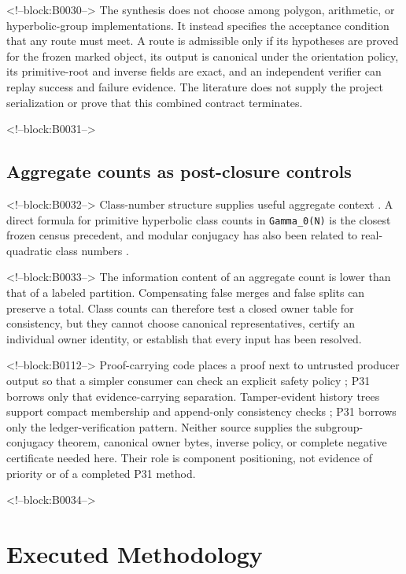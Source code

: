 \documentclass[11pt]{article}
\begin{document}
<!--block:B0030-->
The synthesis does not choose among polygon, arithmetic, or
hyperbolic-group implementations. It instead specifies the acceptance
condition that any route must meet. A route is admissible only if its
hypotheses are proved for the frozen marked object, its output is
canonical under the orientation policy, its primitive-root and inverse
fields are exact, and an independent verifier can replay success and
failure evidence. The literature does not supply the project
serialization or prove that this combined contract terminates.

<!--block:B0031-->
\hypertarget{24-aggregate-counts-as-post-closure-controls}{%
\subsection{Aggregate counts as post-closure
controls}\label{24-aggregate-counts-as-post-closure-controls}}

<!--block:B0032-->
Class-number structure supplies useful aggregate context
\citep{P31-S14}.
A direct formula for primitive hyperbolic class counts in
\texttt{Gamma\_0(N)} is the closest frozen census precedent, and modular
conjugacy has also been related to real-quadratic class numbers
\citep{P31-S21,P31-S22}.

<!--block:B0033-->
The information content of an aggregate count is lower than that of a
labeled partition. Compensating false merges and false splits can
preserve a total. Class counts can therefore test a closed owner table
for consistency, but they cannot choose canonical representatives,
certify an individual owner identity, or establish that every input has
been resolved.

<!--block:B0112-->
Proof-carrying code places a proof next to untrusted producer output so that a
simpler consumer can check an explicit safety policy \citep{P31-S23}; P31 borrows
only that evidence-carrying separation.  Tamper-evident history trees support
compact membership and append-only consistency checks \citep{P31-S24}; P31
borrows only the ledger-verification pattern.  Neither source supplies the
subgroup-conjugacy theorem, canonical owner bytes, inverse policy, or complete
negative certificate needed here.  Their role is component positioning, not
evidence of priority or of a completed P31 method.

<!--block:B0034-->
\hypertarget{3-executed-methodology}{%
\section{Executed Methodology}\label{3-executed-methodology}}
\end{document}
